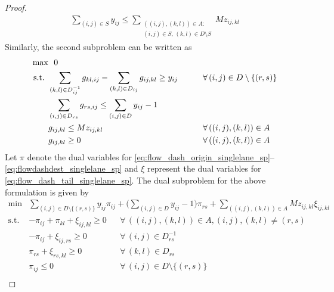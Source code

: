 \documentclass[10pt]{article}
\newcommand{\drivevar}[2]{y_{#1#2}}
\newcommand{\flowvardash}[4]{g_{#1#2,#3#4}}
\newcommand{\countvar}[4]{z_{#1#2,#3#4}}
\newcommand{\validdriveset}{D}
\newcommand{\gridadjset}[2]{D_{#1#2}}
\newcommand{\gridinvadjset}[2]{D^{-1}_{#1#2}}
\newcommand{\gridarcset}{A}
\newcommand{\exitset}{\{(\exitx, \exity)\}}
\newcommand{\exitx}{r}
\newcommand{\exity}{s}
\theoremstyle{definition}
\begin{document}
\begin{proof}
\begin{align}
\sum_{(i,j) \in S} \drivevar{i}{j} \leq  \sum_{\substack{
  ((i,j),(k,l)) \in \gridarcset:\\
  (i,j) \in S,\,
  (k,l) \in D \setminus S
}} M \countvar{i}{j}{k}{l}  \label{eq:simplified_cut_1w_a}
\end{align}
Similarly, the second subproblem can be written as 
\begin{align}
    \max & \, \, \, \, 0  && \notag \\
     \text{s.t. } & \sum_{(k,l) \in \gridinvadjset{i}{j}} \flowvardash{k}{l}{i}{j} - \sum_{(k,l) \in \gridadjset{i}{j}} \flowvardash{i}{j}{k}{l} \geq \drivevar{i}{j}  \qquad && \forall \, (i,j) \in \validdriveset \setminus \exitset \label{eq:flow_dash_origin_singlelane_sp}\\
    & \sum_{(i,j) \in \gridadjset{\exitx}{\exity}} \flowvardash{\exitx}{\exity}{i}{j} \leq \sum_{(i,j) \in \validdriveset} \drivevar{i}{j}  - 1 \qquad && \label{eq:flowdashdest_singlelane_sp}\\
    & \flowvardash{i}{j}{k}{l} \leq M \countvar{i}{j}{k}{l}  \qquad && \forall \, ((i,j), (k,l)) \in \gridarcset \label{eq:flow_dash_tail_singlelane_sp}\\
    & \flowvardash{i}{j}{k}{l} \geq 0 \qquad && \forall \, ((i,j), (k,l)) \in \gridarcset \label{eq:g_non_negative_sp}
\end{align}
Let $\pi$ denote the dual variables for \eqref{eq:flow_dash_origin_singlelane_sp}--\eqref{eq:flowdashdest_singlelane_sp} and $\xi$ represent the dual variables for \eqref{eq:flow_dash_tail_singlelane_sp}. 
The dual subproblem for the above formulation is given by 
\begin{align}
    \min &\sum_{(i,j) \in \validdriveset \setminus \exitset} \drivevar{i}{j}\pi_{ij} + \Bigg(\sum_{(i,j) \in \validdriveset} \drivevar{i}{j}  - 1 \Bigg) \pi_{rs} + \sum_{((i,j), (k,l)) \in \gridarcset}  M \countvar{i}{j}{k}{l} \xi_{ij, kl} \label{eq:sp_dual_1w}
\end{align}
\begin{align}
     \text{s.t. } & - \pi_{ij} + \pi_{kl} + \xi_{ij, kl} \geq 0 && \forall \, ((i,j), (k,l)) \in \gridarcset, (i, j), (k, l) \neq (r, s)  \label{eq:sp_dual_1w_6} \\
     & - \pi_{ij} + \xi_{ij, rs} \geq 0 && \forall \,  (i,j) \in \gridinvadjset{r}{s}  \label{eq:sp_dual_1w_7} \\
    & \pi_{rs} + \xi_{rs, kl} \geq 0 && \forall \,  (k,l) \in \gridadjset{r}{s}  \label{eq:sp_dual_1w_8} \\
    & \pi_{ij} \leq 0 && \forall \, (i,j) \in \validdriveset \setminus \{(r, s)\} \label{eq:sp_dual_1w_9} \\

\end{align}
\end{proof}
\end{document}
